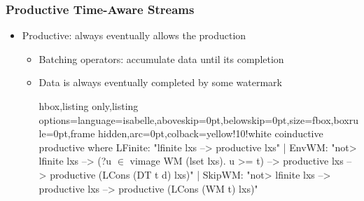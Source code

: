 \documentclass[aspectratio=169,10pt]{beamer}
\begin{document}
\begin{frame}[fragile]
  \frametitle{Productive Time-Aware Streams}
  \begin{itemize}
    \item Productive: always eventually allows the production
          \pause
          \begin{itemize}
            \item Batching operators: accumulate data until its completion
          \pause
            \item Data is always eventually completed by some watermark
\vspace*{-1ex}
\begin{tcblisting}{hbox,listing only,listing options={language=isabelle,aboveskip=0pt,belowskip=0pt},size=fbox,boxrule=0pt,frame hidden,arc=0pt,colback=yellow!10!white}
coinductive productive where
  LFinite: "lfinite lxs --> productive lxs"
| EnvWM: "\<not> lfinite lxs --> (?u $\in$ vimage WM (lset lxs). u >= t) -->
   productive lxs --> productive (LCons (DT t d) lxs)"
| SkipWM: "\<not> lfinite lxs --> productive lxs -->
   productive (LCons (WM t) lxs)"
\end{tcblisting}
\vspace*{-1ex}


\end{itemize}
\end{itemize}
\end{frame}
\end{document}
